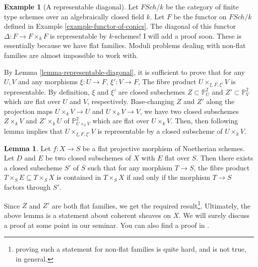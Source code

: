 \documentclass[11pt]{amsart}
\renewcommand{\P}{{\mathbb P}}
\theoremstyle{definition}
\newtheorem{lemma}[theorem]{Lemma}
\newtheorem{example}[theorem]{Example}
\begin{document}
\begin{example}[A representable diagonal]
	\label{example-schematic-diagonal}
	Let $\mathit{FSch/k}$ be the category of finite type schemes over an algebraically closed field $k$. Let $F$ be the functor on $\mathit{FSch/k}$ defined in Example \ref{example-functor-of-conics}. The diagonal of this functor $\Delta: F\rightarrow F\times_k F$ is representable by $k$-schemes! I will add a proof soon. These is essentially because we have flat families. Moduli problems dealing with non-flat families are almost impossible to work with.
	
	By Lemma \ref{lemma-representable-diagonal}, it is sufficient to prove that for any $U,V$ and any morphisms $\xi:U\rightarrow F$, $\xi':V\rightarrow F$, The fibre product $U\times_{\xi,F,\xi'} V$ is representable. By definition, $\xi$ and $\xi'$ are closed subschemes $Z\subset \P_U^2$ and $Z'\subset \P_V^2$ which are flat over $U$ and $V$, respectively. Base-changing $Z$ and $Z'$ along the projection maps $U\times_k V\rightarrow U$ and $U\times_k V\rightarrow V$, we have two closed subschemes $Z\times_k V$ and $Z'\times_k U$ of $\P_{U\times_k V}^2$ which are flat over $U\times_k V$. Then, then following lemma implies that $U\times_{\xi,F,\xi'} V$ is representable by a closed subscheme of $U\times_k V$.
	
	
	
\begin{lemma}
	\label{lemma-equalising-flat-subschemes}
	Let $f: X\rightarrow S$ be a flat projective morphism of Noetherian schemes. Let $D$ and $E$ be two closed subschemes of $X$ with $E$ flat over $S$. Then there exists a closed subscheme $S'$ of $S$ such that for any morphism $T\rightarrow S$, the fibre product $T\times_S E\subseteq T\times_S X$ is contained in $T\times_S X$ if and only if the morphism $T\rightarrow S$ factors through $S'$.
\end{lemma}

Since $Z$ and $Z'$ are both flat families, we get the required result\footnote{proving such a statement for non-flat families is quite hard, and is not true, in general.}. Ultimately, the above lemma is a statement about coherent sheaves on $X$. We will surely discuss a proof at some point in our seminar. You can also find a proof in \cite[Lemma B.6.2]{ACV03}.

\end{example}
\end{document}
